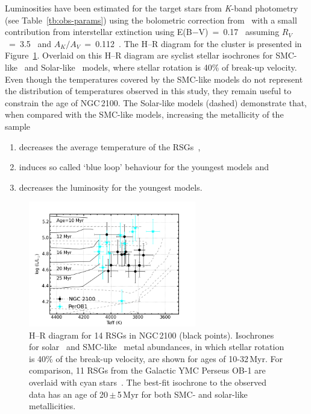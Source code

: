 Luminosities have been estimated for the target stars from {\it K}-band photometry (see Table~\ref{tb:obs-params}) using the bolometric correction from~\cite{2013ApJ...767....3D} with a small contribution from interstellar extinction using E(B$-$V)~=~0.17~\citep{2015A&A...575A..62N} assuming $R_V$~=~3.5~\citep{2013A&A...558A.134D} and $A_K/A_V$~=~0.112~\citep{1985ApJ...288..618R}.
The H--R diagram for the cluster is presented in Figure~\ref{fig:HRD}.
Overlaid on this H--R diagram are {\sc syclist} stellar isochrones for SMC-like~\citep[solid lines;][]{2013A&A...558A.103G} and Solar-like~\citep[dashed lines;][]{2012A&A...537A.146E} models, where stellar rotation is 40\% of break-up velocity.
Even though the temperatures covered by the SMC-like models do not represent the distribution of temperatures observed in this study, they remain useful to constrain the age of NGC\,2100.
The Solar-like models (dashed) demonstrate that, when compared with the SMC-like models, increasing the metallicity of the sample
\begin{enumerate}
\item decreases the average temperature of the RSGs~\citep[something which is not observed by][see Chapter~\ref{ch:ngc6822}]{2015ApJ...803...14P},
\item induces so called `blue loop' behaviour for the youngest models and
\item decreases the luminosity for the youngest models.
\end{enumerate}

\begin{figure}
\centering
 \includegraphics[width=0.65\textwidth]{ngc2100/NGC2100-HRD-perOB1}
 \caption{H--R diagram for 14 RSGs in NGC\,2100 (black points).
  Isochrones for solar~\citep[dashed grey lines;][]{2012A&A...537A.146E} and SMC-like~\citep[solid black lines;][]{2013A&A...558A.103G} metal abundances,
  in which stellar rotation is 40\% of the break-up velocity, are shown for ages of 10-32\,Myr. For comparison, 11 RSGs from the Galactic YMC Perseus OB-1 are overlaid with cyan stars~\citep{2014ApJ...788...58G}.
  The best-fit isochrone to the observed data has an age of 20\,$\pm$\,5\,Myr for both SMC- and solar-like metallicities.
  \label{fig:HRD}
          }
\end{figure}

